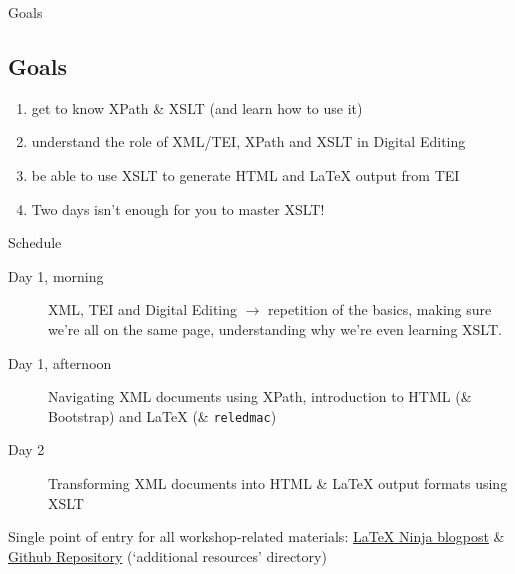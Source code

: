 \begin{frame}{Goals}
\subsection{Goals}
\begin{enumerate}
    \item get to know XPath \& XSLT (and learn how to use it)
    \item understand the role of XML/TEI, XPath and XSLT in Digital Editing
    \item be able to use XSLT to generate HTML and \LaTeX{} output from TEI
    \item \alert{Two days isn't enough for you to master XSLT!}
\end{enumerate}

\begin{alertblock}{Schedule}
\footnotesize
\begin{description}
  \item[Day 1, morning] XML, TEI and Digital Editing $\to$ repetition of the basics, making sure we're all on the same page, understanding why we're even learning XSLT.
  \item[Day 1, afternoon] Navigating XML documents using XPath, introduction to HTML (\& Bootstrap) and \LaTeX{} (\& \texttt{reledmac})
  \item[Day 2] Transforming XML documents into HTML \& \LaTeX{} output formats using XSLT
\end{description}
\end{alertblock}
\end{frame}

\begin{frame}[standout]
    Single point of entry for all workshop-related materials: 
    \alert{\href{https://latex-ninja.com/2022/04/17/first-ever-latex-ninja-workshop-at-harvard-beyond-tei-digital-editions-with-xpath-and-xslt-for-the-web-and-in-latex/}{\LaTeX{} Ninja blogpost}} \& \alert{\href{https://github.com/sarahalang/Harvard_BeyondTEI_Workshop_SLang2022}{Github Repository}} (`additional resources' directory)
\end{frame}


